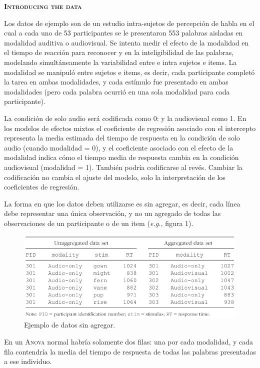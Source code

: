 \documentclass[a4paper,12pt]{article}
\begin{document}
{\scshape\bfseries Introducing the data}

Los datos de ejemplo son de un estudio intra-sujetos de percepción de habla en el cual a cada uno de 53 participantes se le presentaron 553 palabras aisladas en modalidad auditiva o audiovisual. Se intenta medir el efecto de la modalidad en el tiempo de reacción para reconocer y en la inteligibilidad de las palabras, modelando simultáneamente la variabilidad entre e intra sujetos e items. La modalidad se manipuló entre sujetos e items, es decir, cada participante completó la tarea en ambas modalidades, y cada estímulo fue presentado en ambas modalidades (pero cada palabra ocurrió en una sola modalidad para cada participante).

La condición de solo audio será codificada como 0: y la audiovisual como 1. En los modelos de efectos mixtos el coeficiente de regresión asociado con el intercepto representa la media estimada del tiempo de respuesta en la condición de solo audio (cuando modalidad = 0), y el coeficiente asociado con el efecto de la modalidad indica cómo el tiempo media de respuesta cambia en la condición audiovisual (modalidad = 1). También podría codificarse al revés. Cambiar la codificación no cambia el ajuste del modelo, solo la interpretación de los coeficientes de regresión.

La forma en que los datos deben utilizarse es sin agregar, es decir, cada línea debe representar una única observación, y no un agregado de todas las observaciones de un participante o de un item ({\itshape e.g.,} figura 1).

\begin{figure}[ht]
        \begin{center}
                \includegraphics[scale=0.5]{Brown2021(1).png}
                \caption{Ejemplo de datos sin agregar.}
        \end{center}
\end{figure}

En un {\scshape Anova} normal habría solamente dos filas: una por cada modalidad, y cada fila contendría la media del tiempo de respuesta de todas las palabras presentadas a ese individuo.
\end{document}
